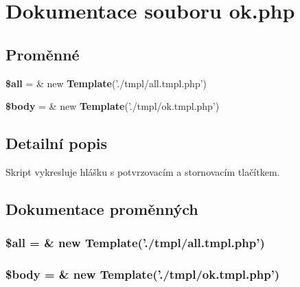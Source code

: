 \section{Dokumentace souboru ok.php}
\label{ok_8php}
\subsection*{Proměnné}
\begin{CompactItemize}
\item 
{\bf \$all} = \& new {\bf Template}('./tmpl/all.tmpl.php')
\item 
{\bf \$body} = \& new {\bf Template}('./tmpl/ok.tmpl.php')
\end{CompactItemize}


\subsection{Detailní popis}
Skript vykresluje hlášku s potvrzovacím a stornovacím tlačítkem. 

\subsection{Dokumentace proměnných}
\subsubsection{\setlength{\rightskip}{0pt plus 5cm}\$all = \& new {\bf Template}('./tmpl/all.tmpl.php')}\label{ok_8php_3c74ea9d2348c9aba28d36e692bef2d2}


\subsubsection{\setlength{\rightskip}{0pt plus 5cm}\$body = \& new {\bf Template}('./tmpl/ok.tmpl.php')}\label{ok_8php_26b9f9373f7bb79dfcf8a86dff086b45}


